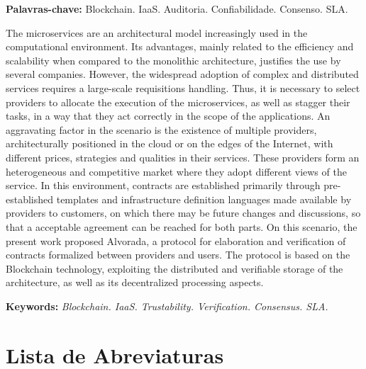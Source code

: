 \noindent \textbf{Palavras-chave:} Blockchain. IaaS. Auditoria. Confiabilidade. Consenso. SLA.

 

\noindent The microservices are an architectural model increasingly used in the computational environment. Its advantages, mainly related to the efficiency and scalability when compared to the monolithic architecture, justifies the use by several companies.
%
However, the widespread adoption of complex and distributed services requires a large-scale requisitions handling.
%
Thus, it is necessary to select providers to allocate the execution of the microservices, as well as stagger their tasks, in a way that they act correctly in the scope of the applications.
%
An aggravating factor in the scenario is the existence of multiple providers, architecturally positioned in the cloud or on the edges of the Internet, with different prices, strategies and qualities in their services.
%
These providers form an heterogeneous and competitive market where they adopt different views of the service.
%
In this environment, contracts are established primarily through pre-established templates and infrastructure definition languages made available by providers to customers, on which there may be future changes and discussions, so that a acceptable agreement can be reached for both parts.
%
On this scenario, the present work proposed Alvorada, a protocol for elaboration and verification of contracts formalized between providers and users.
%
The protocol is based on the Blockchain technology, exploiting the distributed and verifiable storage of the architecture, as well as its decentralized processing aspects.

\noindent \textbf{Keywords:} \textit{Blockchain. IaaS. Trustability. Verification. Consensus. SLA.}

\tableofcontents
\listoffigures
\newpage
\chapter*{Lista de Abreviaturas\hfill} 


\newpage
\pagestyle{myheadings}
